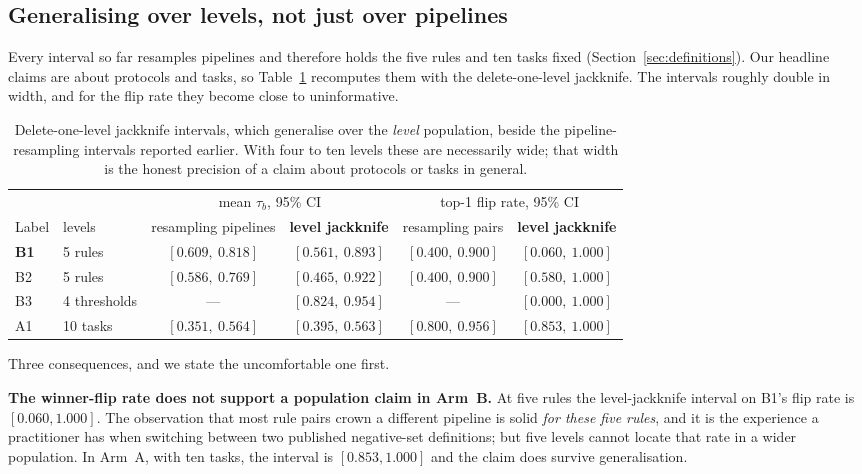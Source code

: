 \documentclass[11pt,a4paper]{article}
\begin{document}
\subsection{Generalising over levels, not just over pipelines}
\label{sec:level-uncertainty}

Every interval so far resamples pipelines and therefore holds the five rules and ten tasks
fixed (Section~\ref{sec:definitions}). Our headline claims are about protocols and tasks, so
Table~\ref{tab:leveljack} recomputes them with the delete-one-level jackknife. The
intervals roughly double in width, and for the flip rate they become close to
uninformative.

\begin{table}[htbp]\centering\small
\caption{Delete-one-level jackknife intervals, which generalise over the \emph{level}
population, beside the pipeline-resampling intervals reported earlier. With four to ten
levels these are necessarily wide; that width is the honest precision of a claim about
protocols or tasks in general.}
\label{tab:leveljack}
\begin{tabular}{llcccc}
\toprule
 & & \multicolumn{2}{c}{mean $\tau_b$, 95\% CI} & \multicolumn{2}{c}{top-1 flip rate, 95\% CI} \\
\cmidrule(lr){3-4}\cmidrule(lr){5-6}
Label & levels & resampling pipelines & \textbf{level jackknife} & resampling pairs & \textbf{level jackknife} \\
\midrule
\textbf{B1} & 5 rules      & $[0.609,\ 0.818]$ & $[0.561,\ 0.893]$ & $[0.400,\ 0.900]$ & $[0.060,\ 1.000]$ \\
B2 & 5 rules      & $[0.586,\ 0.769]$ & $[0.465,\ 0.922]$ & $[0.400,\ 0.900]$ & $[0.580,\ 1.000]$ \\
B3 & 4 thresholds & ---               & $[0.824,\ 0.954]$ & ---               & $[0.000,\ 1.000]$ \\
A1 & 10 tasks     & $[0.351,\ 0.564]$ & $[0.395,\ 0.563]$ & $[0.800,\ 0.956]$ & $[0.853,\ 1.000]$ \\
\bottomrule
\end{tabular}
\end{table}

Three consequences, and we state the uncomfortable one first.

\textbf{The winner-flip rate does not support a population claim in Arm~B.} At five rules
the level-jackknife interval on B1's flip rate is $[0.060, 1.000]$. The observation that
most rule pairs crown a different pipeline is solid \emph{for these five rules}, and it is
the experience a practitioner has when switching between two published negative-set
definitions; but five levels cannot locate that rate in a wider population. In Arm~A, with
ten tasks, the interval is $[0.853, 1.000]$ and the claim does survive generalisation.
\end{document}
